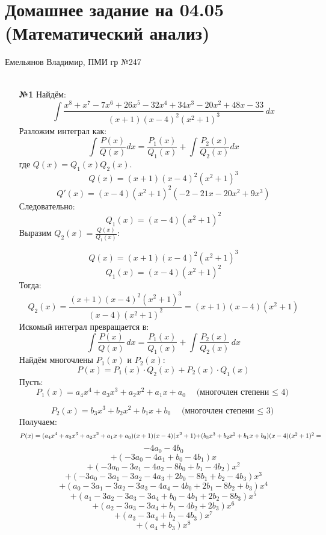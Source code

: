 \documentclass[a4paper]{article}
\renewcommand{\leq}{\leqslant}
\begin{document}
\section*{Домашнее задание на 04.05 (Математический анализ)}
 {\large Емельянов Владимир, ПМИ гр №247}\\\\
\begin{enumerate}
    \item[\textbf{№1}]Найдём:
    \[
    \int \frac{x^8 + x^7 - 7x^6 + 26x^5 - 32x^4 + 34x^3 - 20x^2 + 48x - 33}{(x+1)(x-4)^2(x^2+1)^3} \, dx
    \]
    Разложим интеграл как:
    \[
    \int \frac{P(x)}{Q(x)} dx = \frac{P_1(x)}{Q_1(x)} + \int \frac{P_2(x)}{Q_2(x)} dx
    \]
    где \( Q(x) = Q_1(x) Q_2(x) \).
    \[ Q(x) = (x+1)(x-4)^2(x^2+1)^3 \]
    \[
    Q'(x) = (x-4)(x^2+1)^2(-2 - 21x - 20x^2 + 9x^3)
    \]
    Следовательно:
    \[
    Q_1(x) = (x-4)(x^2+1)^2
    \]
    Выразим \(Q_2(x) = \frac{Q(x)}{Q_1(x)}\):
    
    \[
    Q(x) = (x+1)(x-4)^2(x^2+1)^3
    \]
    \[
    Q_1(x) = (x-4)(x^2+1)^2
    \]
    Тогда:
    \[
    Q_2(x) = \frac{(x+1)(x-4)^2(x^2+1)^3}{(x-4)(x^2+1)^2} = (x+1)(x-4)(x^2+1)
    \]
    Искомый интеграл превращается в:
    \[
    \int \frac{P(x)}{Q(x)} \, dx = \frac{P_1(x)}{Q_1(x)} + \int \frac{P_2(x)}{Q_2(x)} \, dx
    \]
    Найдём  многочлены \(P_1(x)\) и \(P_2(x)\):
    \[
    P(x) = P_1(x) \cdot Q_2(x) + P_2(x) \cdot Q_1(x)
    \]
    Пусть:
    \[
    P_1(x) = a_4 x^4 + a_3 x^3 + a_2 x^2 + a_1 x + a_0
    \quad \text{(многочлен степени $\leq$ 4)}
    \]

    \[
    P_2(x) = b_3 x^3 + b_2 x^2 + b_1 x + b_0
    \quad\text{(многочлен степени $\leq$ 3)}
    \]
    Получаем:
    \[
    P(x) = (a_4 x^4 + a_3 x^3 + a_2 x^2 + a_1 x + a_0)(x+1)(x-4)(x^2+1) $$
    $$ + (b_3 x^3 + b_2 x^2 + b_1 x + b_0)(x-4)(x^2+1)^2 = 
    \]
    \[
    -4a_0 - 4b_0
    \]
    \[
    + (-3a_0 - 4a_1 + b_0 - 4b_1)x
    \]
    \[
    + (-3a_0 - 3a_1 - 4a_2 - 8b_0 + b_1 - 4b_2)x^2
    \]
    \[
    + (-3a_0 - 3a_1 - 3a_2 - 4a_3 + 2b_0 - 8b_1 + b_2 - 4b_3)x^3
    \]
    \[
    + (a_0 - 3a_1 - 3a_2 - 3a_3 - 4a_4 - 4b_0 + 2b_1 - 8b_2 + b_3)x^4
    \]
    \[
    + (a_1 - 3a_2 - 3a_3 - 3a_4 + b_0 - 4b_1 + 2b_2 - 8b_3)x^5
    \]
    \[
    + (a_2 - 3a_3 - 3a_4 + b_1 - 4b_2 + 2b_3)x^6
    \]
    \[
    + (a_3 - 3a_4 + b_2 - 4b_3)x^7
    \]
    \[
    + (a_4 + b_3)x^8
    \]


\end{enumerate}
\end{document}
